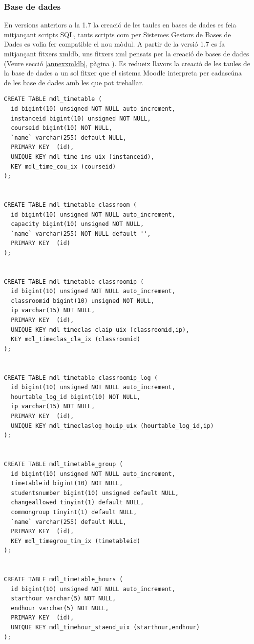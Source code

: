 \documentclass[a4paper]{report}  %
\begin{document}
\subsubsection{Base de dades}\label{AnalisiBasededades}
En versions anteriors a la 1.7 la creació de les taules en bases de dades es feia mitjançant scripts SQL, tants scripts com per Sistemes Gestors de Bases de Dades es volia fer compatible el nou mòdul. A partir de la versió 1.7 es fa mitjançant fitxers xmldb, uns fitxers xml pensats per la creació de bases de dades (Veure secció \ref{annexxmldb}, pàgina \pageref{annexxmldb} ). Es redueix llavors la creació de les taules de la base de dades a un sol fitxer que el sistema Moodle interpreta per cadascúna de les base de dades amb les que pot treballar.
\begin{lstlisting}[style=SQL, caption=Sentències SQL equivalents al fitxer xmldb per la creació de les taules]
CREATE TABLE mdl_timetable ( 
  id bigint(10) unsigned NOT NULL auto_increment, 
  instanceid bigint(10) unsigned NOT NULL, 
  courseid bigint(10) NOT NULL, 
  `name` varchar(255) default NULL, 
  PRIMARY KEY  (id), 
  UNIQUE KEY mdl_time_ins_uix (instanceid), 
  KEY mdl_time_cou_ix (courseid) 
); 


CREATE TABLE mdl_timetable_classroom ( 
  id bigint(10) unsigned NOT NULL auto_increment, 
  capacity bigint(10) unsigned NOT NULL, 
  `name` varchar(255) NOT NULL default '', 
  PRIMARY KEY  (id) 
); 


CREATE TABLE mdl_timetable_classroomip ( 
  id bigint(10) unsigned NOT NULL auto_increment, 
  classroomid bigint(10) unsigned NOT NULL, 
  ip varchar(15) NOT NULL, 
  PRIMARY KEY  (id), 
  UNIQUE KEY mdl_timeclas_claip_uix (classroomid,ip), 
  KEY mdl_timeclas_cla_ix (classroomid) 
); 


CREATE TABLE mdl_timetable_classroomip_log ( 
  id bigint(10) unsigned NOT NULL auto_increment, 
  hourtable_log_id bigint(10) NOT NULL, 
  ip varchar(15) NOT NULL, 
  PRIMARY KEY  (id), 
  UNIQUE KEY mdl_timeclaslog_houip_uix (hourtable_log_id,ip) 
); 


CREATE TABLE mdl_timetable_group ( 
  id bigint(10) unsigned NOT NULL auto_increment, 
  timetableid bigint(10) NOT NULL, 
  studentsnumber bigint(10) unsigned default NULL, 
  changeallowed tinyint(1) default NULL, 
  commongroup tinyint(1) default NULL, 
  `name` varchar(255) default NULL, 
  PRIMARY KEY  (id), 
  KEY mdl_timegrou_tim_ix (timetableid) 
); 


CREATE TABLE mdl_timetable_hours ( 
  id bigint(10) unsigned NOT NULL auto_increment, 
  starthour varchar(5) NOT NULL, 
  endhour varchar(5) NOT NULL, 
  PRIMARY KEY  (id), 
  UNIQUE KEY mdl_timehour_staend_uix (starthour,endhour) 
); 



\end{lstlisting}
\end{document}
